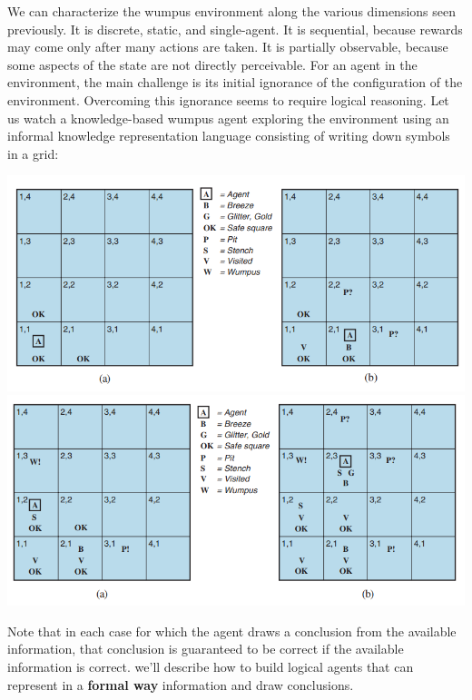 We can characterize the wumpus environment along the various dimensions seen previously. It is discrete, static, and single-agent. It is sequential, because rewards may come only after many actions are taken. It is partially observable, because some aspects of the state are not directly perceivable. For an agent in the environment, the main challenge is its initial ignorance of the configuration of the environment.  Overcoming this ignorance seems to require logical reasoning.\newline\newline
Let us watch a knowledge-based wumpus agent exploring the environment using an informal knowledge representation language consisting of writing
down symbols in a grid:
\begin{center}
    \includegraphics[scale=0.8]{images/wumpus-grid.png}
    \includegraphics[scale=0.8]{images/wumpus-grid2.png}
\end{center}
Note that in each case for which the agent draws a conclusion from the available information, that conclusion is guaranteed to be correct if the available information is correct. we'll describe how to build logical agents that can represent in a \textbf{formal way} information and draw conclusions.

